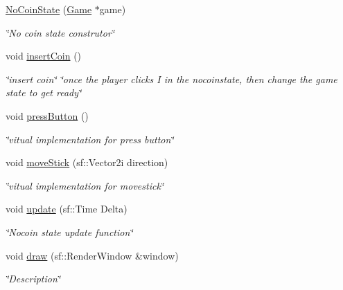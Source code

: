 \begin{DoxyCompactItemize}
\item 
\hyperlink{classNoCoinState_ab06a3e84e2a20c14e036e68e9e6eb667}{No\+Coin\+State} (\hyperlink{classGame}{Game} $\ast$game)
\begin{DoxyCompactList}\small\item\em \char`\"{}\+No coin state construtor\char`\"{} \end{DoxyCompactList}\item 
\mbox{\label{classNoCoinState_a417209eadad2f71284cf09d369bc389e}} 
void \hyperlink{classNoCoinState_a417209eadad2f71284cf09d369bc389e}{insert\+Coin} ()
\begin{DoxyCompactList}\small\item\em \char`\"{}insert coin\char`\"{}  \char`\"{}once the player clicks I in the nocoinstate, then change the game state to get ready\char`\"{} \end{DoxyCompactList}\item 
\mbox{\label{classNoCoinState_a47dd2924ce9601b45ee11e0d9b8452f7}} 
void \hyperlink{classNoCoinState_a47dd2924ce9601b45ee11e0d9b8452f7}{press\+Button} ()
\begin{DoxyCompactList}\small\item\em \char`\"{}vitual implementation for press button\char`\"{} \end{DoxyCompactList}\item 
\mbox{\label{classNoCoinState_a9df4914c752847a6a57f81eb921ab9b5}} 
void \hyperlink{classNoCoinState_a9df4914c752847a6a57f81eb921ab9b5}{move\+Stick} (sf\+::\+Vector2i direction)
\begin{DoxyCompactList}\small\item\em \char`\"{}vitual implementation for movestick\char`\"{} \end{DoxyCompactList}\item 
void \hyperlink{classNoCoinState_a63f0b15e0a56b25d4a9a91a4bba35414}{update} (sf\+::\+Time Delta)
\begin{DoxyCompactList}\small\item\em \char`\"{}\+Nocoin state update function\char`\"{} \end{DoxyCompactList}\item 
void \hyperlink{classNoCoinState_a62c20a535a5b7af0d04d791d97834655}{draw} (sf\+::\+Render\+Window \&window)
\begin{DoxyCompactList}\small\item\em \char`\"{}\+Description\char`\"{} \end{DoxyCompactList}\end{DoxyCompactItemize}

